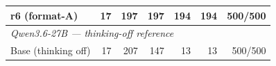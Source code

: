 \begin{table}[t]
{\begin{tabular}{lrrrrrr}
r6 (format-A) & 17 & 197 & 197 & 194 & 194 & 500/500 \\
\midrule
\multicolumn{7}{l}{\textit{Qwen3.6-27B --- thinking-off reference}} \\
Base (thinking off) & 17 & 207 & 147 & 13 & 13 & 500/500 \\
\bottomrule
\end{tabular}%
}
\end{table}
